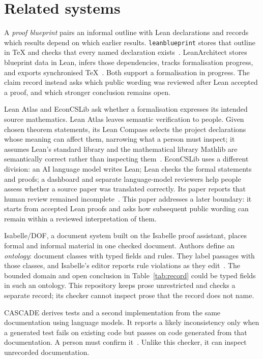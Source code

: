 \documentclass[11pt]{article}
\begin{document}
\section{Related systems}\label{sec:related}

A \emph{proof blueprint} pairs an informal outline with Lean declarations and
records which results depend on which earlier results.  \texttt{leanblueprint}
stores that outline in \TeX{} and checks that every named declaration
exists~\cite{leanblueprint}.  LeanArchitect stores blueprint data in Lean,
infers those dependencies, tracks formalisation progress, and exports
synchronised \TeX{}~\cite{leanarchitect}.  Both support a formalisation in
progress.  The claim record instead asks which public wording was reviewed
after Lean accepted a proof, and which stronger conclusion remains open.

Lean Atlas and EconCSLib ask whether a formalisation expresses its intended
source mathematics.  Lean Atlas leaves semantic verification to people.  Given
chosen theorem statements, its Lean Compass selects the project declarations
whose meaning can affect them, narrowing what a person must inspect; it assumes
Lean's standard library and the mathematical library Mathlib are semantically
correct rather than inspecting them~\cite{leanatlas}.  EconCSLib uses a
different division: an AI language model writes Lean; Lean checks the formal
statements and proofs; a dashboard and separate language-model reviewers help
people assess whether a source paper was translated correctly.  Its paper
reports that human review remained incomplete~\cite{econcs}.  This paper
addresses a later boundary: it starts from accepted Lean proofs and asks how
subsequent public wording can remain within a reviewed interpretation of them.

Isabelle/DOF, a document system built on the Isabelle proof assistant, places
formal and informal material in one checked document.
Authors define an \emph{ontology}: document classes with typed fields and rules.
They label passages with those classes, and Isabelle's editor reports rule
violations as they edit~\cite{isadof}.  The bounded domain and open
conclusion in Table~\ref{tab:record} could be typed fields in such an ontology.
This repository keeps prose unrestricted and checks a separate record; its
checker cannot inspect prose that the record does not name.

CASCADE derives tests and a second implementation from the same documentation
using language models.  It reports a likely inconsistency only when a generated
test fails on existing code but passes on code generated from that
documentation.  A person must confirm it~\cite{cascade}.  Unlike this checker,
it can inspect unrecorded documentation.
\end{document}
